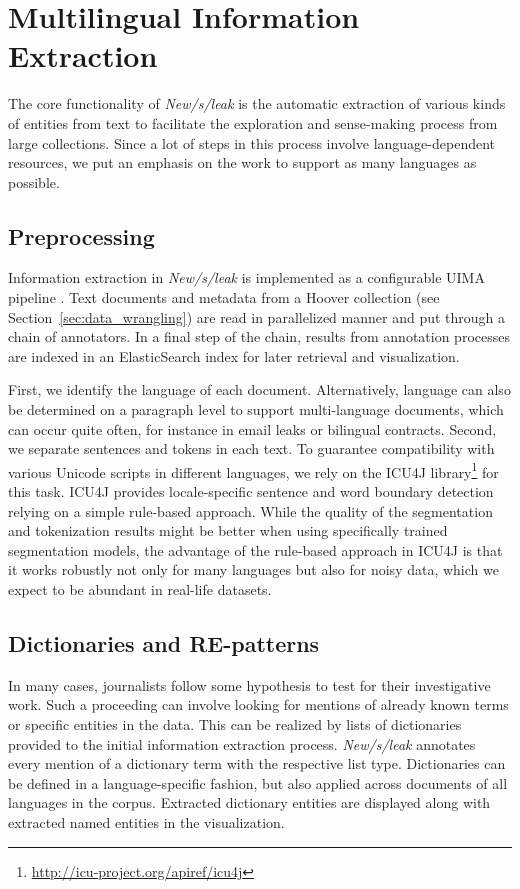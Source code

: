 \documentclass[11pt,a4paper]{article}
\begin{document}
\section{Multilingual Information Extraction}
\label{sec:multilang_ner}

The core functionality of \emph{New/s/leak} is the automatic extraction of various kinds of entities from text to facilitate the exploration and sense-making process from large collections. Since a lot of steps in this process involve language-dependent resources, we put an emphasis on the work to support as many languages as possible.

\subsection{Preprocessing}

Information extraction in \emph{New/s/leak} is implemented as a configurable UIMA pipeline \cite{Ferrucci.2004b}. Text documents and metadata from a Hoover collection (see Section~\ref{sec:data_wrangling}) are read in parallelized manner and put through a chain of annotators. In a final step of the chain, results from annotation processes are indexed in an ElasticSearch index for later retrieval and visualization.

First, we identify the language of each document. Alternatively, language can also be determined on a paragraph level to support multi-language documents, which can occur quite often, for instance in email leaks or bilingual contracts. Second, we separate sentences and tokens in each text. To guarantee compatibility with various Unicode scripts in different languages, we rely on the ICU4J library\footnote{\url{http://icu-project.org/apiref/icu4j}} for this task. ICU4J provides locale-specific sentence and word boundary detection relying on a simple rule-based approach. While the quality of the segmentation and tokenization results might be better when using specifically trained segmentation models, the advantage of the rule-based approach in ICU4J is that it works robustly not only for many languages but also for noisy data, which we expect to be abundant in real-life datasets.

\subsection{Dictionaries and RE-patterns}

In many cases, journalists follow some hypothesis to test for their investigative work. Such a proceeding can involve looking for mentions of already known terms or specific entities in the data. This can be realized by lists of dictionaries provided to the initial information extraction process. \emph{New/s/leak} annotates every mention of a dictionary term with the respective list type. Dictionaries can be defined in a language-specific fashion, but also applied across documents of all languages in the corpus. Extracted dictionary entities are displayed along with extracted named entities in the visualization.
\end{document}
